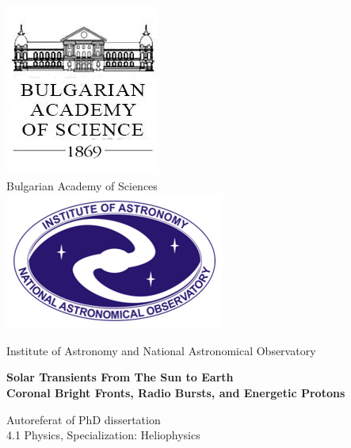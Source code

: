 \begin{titlepage}
    \begin{center}
        \vspace*{0.4cm}
        \centering
        \includegraphics[scale=0.7]{extras/bas_bg_logo.jpg}\\
        
        \LARGE
        Bulgarian Academy of Sciences\\
        
        \vspace*{0.2cm}
        \includegraphics[scale=0.5]{extras/ianao_logo.png}\\
        \vspace*{0.2cm}
        
        \LARGE
        Institute of Astronomy and National Astronomical Observatory\\
        
        \vspace{1cm}
        
        \huge
        \textbf{Solar Transients From The Sun to Earth\\}
        \huge
        \textbf{Coronal Bright Fronts, Radio Bursts, and Energetic Protons}
        
        \vspace{1cm}
        
        \LARGE
        Autoreferat of PhD dissertation\\
        4.1 Physics, Specialization: Heliophysics
        

\end{center}
\end{titlepage}
